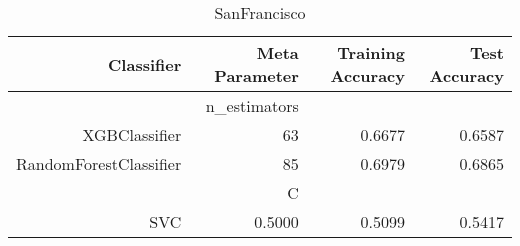 
\begin{table}[H]
    \caption{SanFrancisco}
    \centering
    \begin{tabular}{|r|r|r|r|}
        \hline
        Classifier &Meta Parameter &Training Accuracy
        &Test Accuracy\\
        \hline
        &n\_estimators &\multicolumn{2}{|r|}{}\\
        \hline
        XGBClassifier &63 &0.6677 &0.6587\\
        \hline
        RandomForestClassifier &85 &0.6979 &0.6865\\
        \hline
        &C &\multicolumn{2}{|r|}{}\\
        \hline
        SVC &0.5000 &0.5099 &0.5417\\
        \hline
    \end{tabular}
\end{table}
